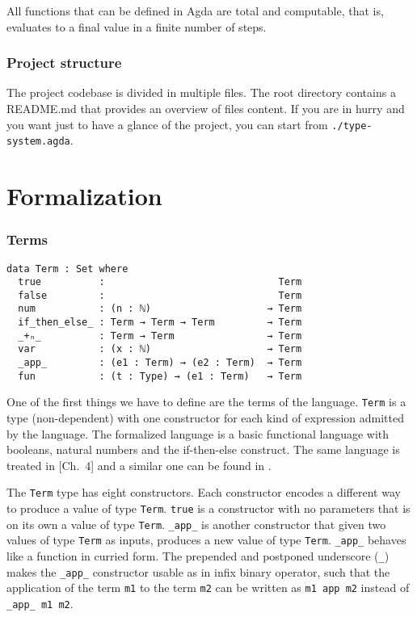 \documentclass{article}
\begin{document}
All functions that can be defined in Agda are total and computable, that is, evaluates to a final value in a finite number of steps.


\subsubsection*{Project structure}

The project codebase is divided in multiple files.
The root directory contains a README.md that provides an overview of files content.
If you are in hurry and you want just to have a glance of the project, you can start from \texttt{./type-system.agda}.


\section{Formalization}

\subsubsection*{Terms}

\begin{verbatim}
data Term : Set where
  true          :                              Term
  false         :                              Term
  num           : (n : ℕ)                    → Term
  if_then_else_ : Term → Term → Term         → Term
  _+ₙ_          : Term → Term                → Term
  var           : (x : ℕ)                    → Term
  _app_         : (e1 : Term) → (e2 : Term)  → Term
  fun           : (t : Type) → (e1 : Term)   → Term
\end{verbatim}

One of the first things we have to define are the terms of the language.
\texttt{Term} is a type (non-dependent) with one constructor for each kind of expression admitted by the language.
The formalized language is a basic functional language with booleans, natural numbers and the if-then-else construct.
The same language is treated in \cite{crafa}[Ch.\ 4] and a similar one can be found in \cite[Ch.\ 9]{pierce}.

The \texttt{Term} type has eight constructors.
Each constructor encodes a different way to produce a value of type \texttt{Term}.
\texttt{true} is a constructor with no parameters that is on its own a value of type \texttt{Term}.
\texttt{\_app\_} is another constructor that given two values of type \texttt{Term} as inputs, produces a new value of type \texttt{Term}.
\texttt{\_app\_} behaves like a function in curried form.
The prepended and postponed underscore (\texttt{\_}) makes the \texttt{\_app\_} constructor usable as in infix binary operator, such that the application of the term \texttt{m1} to the term \texttt{m2} can be written as \texttt{m1 app m2} instead of \texttt{\_app\_ m1 m2}.
\end{document}
